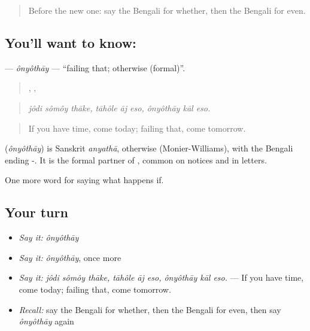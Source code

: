 \label{lesson:BN-C369-onyothay}



\begin{quote}
Before the new one: say the Bengali for whether, then the Bengali for even.
\end{quote}

\subsection*{You'll want to know: }
\textbf{} — \emph{ônyôthāy} — \textquotedblleft{}failing that; otherwise (formal)\textquotedblright{}.

\begin{quote}
  ,   ,   
\end{quote}

\begin{quote}
\emph{jôdi sômôy thāke, tāhôle āj eso, ônyôthāy kāl eso.}
\end{quote}

\begin{quote}
If you have time, come today; failing that, come tomorrow.
\end{quote}

\begin{cousinweb}
\textbf{} (\emph{ônyôthāy}) is Sanskrit \emph{anyathā}, otherwise (Monier-Williams), with the Bengali ending -. It is the formal partner of , common on notices and in letters.
\end{cousinweb}

\begin{grammarlens}[title={What you've built}]
One more word for saying what happens if.
\end{grammarlens}

\subsection*{Your turn}
\begin{itemize}
\raggedright
  \item \emph{Say it:} \emph{ônyôthāy}
  \item \emph{Say it:} \emph{ônyôthāy}, once more
  \item \emph{Say it:} \emph{jôdi sômôy thāke, tāhôle āj eso, ônyôthāy kāl eso.} — If you have time, come today; failing that, come tomorrow.
  \item \emph{Recall:} say the Bengali for whether, then the Bengali for even, then say \emph{ônyôthāy} again
\end{itemize}

